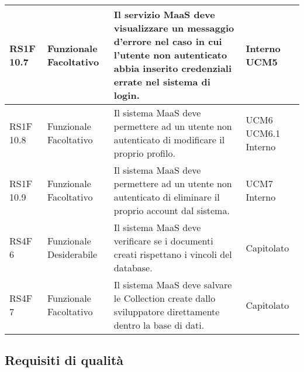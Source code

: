 \begin{center}
\begin{longtable}{ | l | p{2cm} | p{5cm} | p{1.7cm} |}
        RS1F 10.7 & Funzionale \newline  Facoltativo  & Il servizio MaaS deve visualizzare un messaggio d'errore nel caso in cui l'utente non autenticato abbia inserito credenziali errate nel sistema di login. &  Interno \newline  UCM5 \newline  \\ \hline      
        RS1F 10.8 & Funzionale \newline  Facoltativo  & Il sistema MaaS deve permettere ad un utente non autenticato di modificare il proprio profilo. &  UCM6 \newline  UCM6.1 \newline  Interno \newline  \\ \hline      
        RS1F 10.9 & Funzionale \newline  Facoltativo  & Il sistema MaaS deve permettere ad un utente non autenticato di eliminare il proprio account dal sistema. &  UCM7 \newline  Interno \newline  \\ \hline      
        RS4F 6 & Funzionale \newline  Desiderabile  & Il sistema MaaS deve verificare se i documenti creati rispettano i vincoli del database. &  Capitolato \newline  \\ \hline      
        RS4F 7 & Funzionale \newline  Facoltativo  & Il sistema MaaS deve salvare le Collection create dallo sviluppatore direttamente dentro la base di dati. &  Capitolato \newline  \\ \hline
      \end{longtable}
      \egroup
      \end{center}  
\clearpage

\subsection{Requisiti di qualità }

